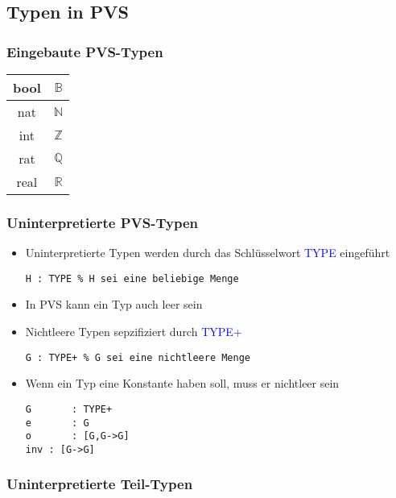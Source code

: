 \documentclass{scrartcl}
\begin{document}
\subsection{Typen in PVS}

\subsubsection{Eingebaute PVS-Typen}

\begin{tabular}{|c|c|}
	\hline 
	bool & $ \mathbb{B} $ \\ 
	\hline 
	nat & $ \mathbb{N} $ \\ 
	\hline 
	int & $ \mathbb{Z} $ \\ 
	\hline 
	rat & $ \mathbb{Q} $ \\ 
	\hline 
	real & $ \mathbb{R} $ \\ 
	\hline 
\end{tabular} 

\subsubsection{Uninterpretierte PVS-Typen}

\begin{itemize}
	\item Uninterpretierte Typen werden durch das Schlüsselwort \textcolor{blue}{TYPE} eingeführt
	\begin{lstlisting}
H : TYPE % H sei eine beliebige Menge
	\end{lstlisting}
	\item In PVS kann ein Typ auch leer sein
	\item Nichtleere Typen sepzifiziert durch \textcolor{blue}{TYPE+}
	\begin{lstlisting}
G : TYPE+ % G sei eine nichtleere Menge
	\end{lstlisting}
	\item Wenn ein Typ eine Konstante haben soll, muss er nichtleer sein
	\begin{lstlisting}
G		: TYPE+
e		: G
o		: [G,G->G]
inv	: [G->G]
	\end{lstlisting}
\end{itemize}

\subsubsection{Uninterpretierte Teil-Typen}
\end{document}
